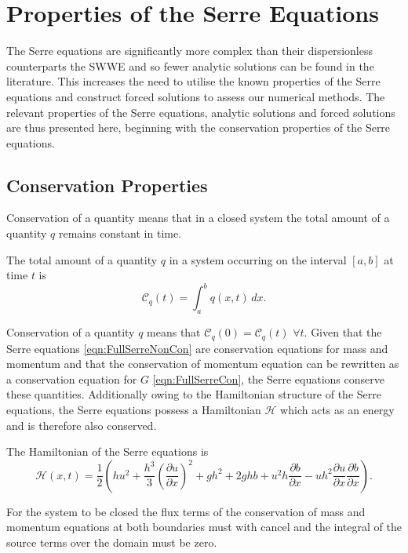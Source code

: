 \section{Properties of the Serre Equations}
The Serre equations are significantly more complex than their dispersionless counterparts the SWWE and so fewer analytic solutions can be found in the literature. This increases the need to utilise the known properties of the Serre equations and construct forced solutions to assess our numerical methods. The relevant properties of the Serre equations, analytic solutions and forced solutions are thus presented here, beginning with the conservation properties of the Serre equations. 


\subsection{Conservation Properties}
Conservation of a quantity means that in a closed system the total amount of a quantity $q$ remains constant in time.
\begin{defn}
	\label{defn:TotalAmmountab}
	The total amount of a quantity $q$ in a system occurring on the interval $[a,b]$ at time $t$ is
	\begin{equation*}
	\mathcal{C}_q(t) = \int_{a}^{b} q(x,t)\, dx.
	\end{equation*}
\end{defn}
Conservation of a quantity $q$ means that $\mathcal{C}_{q}(0) = \mathcal{C}_{q}(t)$ $\forall t$. Given that the Serre equations \eqref{eqn:FullSerreNonCon} are conservation equations for mass and momentum and that the conservation of momentum equation can be rewritten as a conservation equation for $G$ \eqref{eqn:FullSerreCon}, the Serre equations conserve these quantities. Additionally owing to the Hamiltonian structure of the Serre equations, the Serre equations possess a Hamiltonian $\mathcal{H}$ which acts as an energy and is therefore also conserved.

\begin{defn}
	\label{eqn:Hamildef}
	The Hamiltonian of the Serre equations is
	\begin{equation*}
		\mathcal{H}(x,t) = \frac{1}{2} \left(hu^2 + \frac{h^3}{3} \left(\frac{\partial u}{\partial x}\right)^2 + gh^2 + 2ghb + u^2h\frac{\partial b}{\partial x} - uh^2 \frac{\partial u}{\partial x} \frac{\partial b}{\partial x}  \right).
	\end{equation*}
\end{defn}
For the system to be closed the flux terms of the conservation of mass and momentum equations at both boundaries must with cancel and the integral of the source terms over the domain must be zero.

